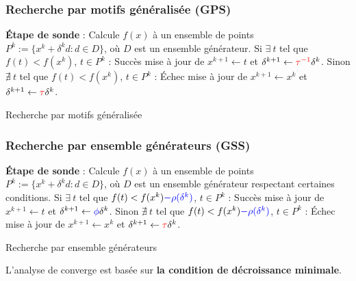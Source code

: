 \documentclass{beamer}
\newcommand\tab[1][1cm]{\hspace*{#1}}
\newcommand{\GPS}{\textsf{GPS}}
\newcommand{\GSS}{\textsf{GSS}}
\begin{document}
\begin{frame}
\frametitle{Recherche par motifs généralisée (\GPS)}
\begin{algorithm}[H]
\begin{algorithmic}[]
\STATE \textbf{Étape de sonde} : Calcule $f(x)$ à un ensemble de points $P^k:=\{x^k+\delta ^k d:d\in D\}$, où {\color{red}$D$ est un ensemble générateur.}
\STATE
\STATE Si $\exists~t$ tel que $f(t) < f(x^k)$, $t\in P^k$ : Succès
\STATE \tab mise à jour de $x^{k+1}\leftarrow t$ et $\delta^{k+1} \leftarrow {\color{red}\tau^{-1}}\delta^k$.
\STATE
\STATE Sinon $\nexists~t$ tel que $f(t) < f(x^k)$, $t\in P^k$ : Échec
\STATE \tab mise à jour de $x^{k+1}\leftarrow x^k$ et $\delta^{k+1} \leftarrow {\color{red}\tau}\delta^k$.
\ENDFOR
\end{algorithmic}
\caption{Recherche par motifs généralisée}
\label{alg:gps}
\end{algorithm}
\end{frame}


\begin{frame}
\frametitle{Recherche par ensemble générateurs (\GSS)}
\begin{algorithm}[H]
\begin{algorithmic}[]
\STATE \textbf{Étape de sonde} : Calcule $f(x)$ à un ensemble de points 
\STATE $P^k:=\{x^k+\delta ^k d:d\in D\}$, où {\color{blue}$D$ est un ensemble générateur 
\STATE respectant certaines conditions}.
\STATE
\STATE Si $\exists~t$ tel que $f(t) < f(x^k){\color{blue}-\rho(\delta^k)}$, $t\in P^k$ : Succès
\STATE \tab mise à jour de $x^{k+1}\leftarrow t$ et $\delta^{k+1} \leftarrow {\color{blue}\phi}\delta^k$.
\STATE
\STATE Sinon $\nexists~t$ tel que $f(t) < f(x^k){\color{blue}-\rho(\delta^k)}$, $t\in P^k$ : Échec
\STATE \tab mise à jour de $x^{k+1}\leftarrow x^k$ et $\delta^{k+1} \leftarrow {\color{red}\tau}\delta^k$.
\ENDFOR
\end{algorithmic}
\caption{Recherche par ensemble générateurs}
\label{alg:gps}
\end{algorithm}
L'analyse de converge est basée sur \textbf{la condition de décroissance minimale}.
\end{frame}
\end{document}
